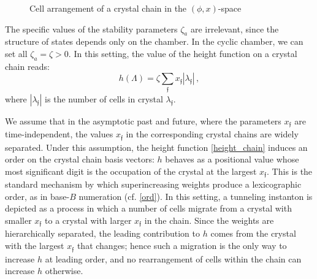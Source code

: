 \documentclass[10pt]{article}
\theoremstyle{definition}
\def\ff{\mathfrak{f}}
\def\lm{\limits}
\numberwithin{equation}{section}
\begin{document}
\begin{figure}[ht!]
	\caption{Cell arrangement of a crystal chain in the $(\phi,x)$-space}\label{fig:chain}
\end{figure}

The specific values of the stability parameters $\zeta_a$ are irrelevant, since the structure of states depends only on the chamber.
In the cyclic chamber, we can set all $\zeta_a=\zeta>0$.
In this setting, the value of the height function on a crystal chain reads:
\begin{equation}\label{height_chain}
	h(\Lambda)=\zeta\sum\lm_{\ff}x_{\ff}|\lambda_{\ff}|\,,
\end{equation}
where $|\lambda_{\ff}|$ is the number of cells in crystal $\lambda_{\ff}$.

We assume that in the asymptotic past and future, where the parameters $x_{\ff}$ are time-independent, the values $x_{\ff}$ in the corresponding crystal chains are widely separated.
Under this assumption, the height function \eqref{height_chain} induces an order on the crystal chain basis vectors: $h$ behaves as a positional value whose most significant digit is the occupation of the crystal at the largest $x_{\ff}$.
This is the standard mechanism by which superincreasing weights produce a lexicographic order, as in base-$B$ numeration (cf. \eqref{ord}).
In this setting, a tunneling instanton is depicted as a process in which a number of cells migrate from a crystal with smaller $x_{\ff}$ to a crystal with larger $x_{\ff}$ in the chain.
Since the weights are hierarchically separated, the leading contribution to $h$ comes from the crystal with the largest $x_{\ff}$ that changes; hence such a migration is the only way to increase $h$ at leading order, and no rearrangement of cells within the chain can increase $h$ otherwise.
\end{document}
